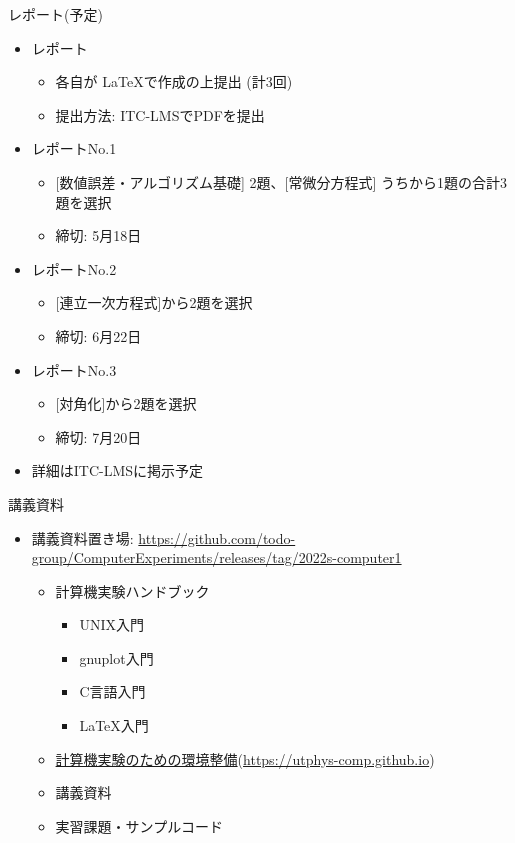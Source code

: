 \begin{frame}[t,fragile]{レポート(予定)}
  \begin{itemize}
  \item レポート
    \begin{itemize}
    \item 各自が \LaTeX で作成の上提出 (計3回)
    \item 提出方法: ITC-LMSでPDFを提出
    \end{itemize}
  \item レポートNo.1
    \begin{itemize}
    \item \mbox{} [数値誤差・アルゴリズム基礎] 2題、[常微分方程式] うちから1題の合計3題を選択
    \item 締切: 5月18日
    \end{itemize}
  \item レポートNo.2
    \begin{itemize}
    \item \mbox{} [連立一次方程式]から2題を選択
    \item 締切: 6月22日
    \end{itemize}
  \item レポートNo.3
    \begin{itemize}
    \item \mbox{} [対角化]から2題を選択
    \item 締切: 7月20日
    \end{itemize}
  \item 詳細はITC-LMSに掲示予定
  \end{itemize}    
\end{frame}

\begin{frame}[t]{講義資料}
  \begin{itemize}
  \item 講義資料置き場: \href{https://github.com/todo-group/ComputerExperiments/releases/tag/2022s-computer1}{https://github.com/todo-group/ComputerExperiments/releases/tag/2022s-computer1}
    \begin{itemize}
    \item 計算機実験ハンドブック
      \begin{itemize}
      \item UNIX入門
      \item gnuplot入門
      \item C言語入門
      \item \LaTeX 入門
      \end{itemize}
    \item \href{https://utphys-comp.github.io}{計算機実験のための環境整備}({\small \href{https://utphys-comp.github.io}{https://utphys-comp.github.io}})
    \item 講義資料
    \item 実習課題・サンプルコード
    \end{itemize}
  \end{itemize}
\end{frame}

